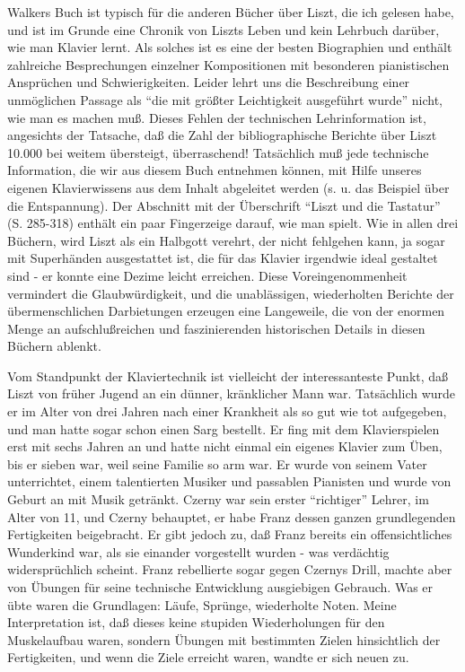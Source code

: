 Walkers Buch ist typisch für die anderen Bücher über Liszt, die ich gelesen habe, und ist im Grunde eine Chronik von Liszts Leben und kein Lehrbuch darüber, wie man Klavier lernt.
Als solches ist es eine der besten Biographien und enthält zahlreiche Besprechungen einzelner Kompositionen mit besonderen pianistischen Ansprüchen und Schwierigkeiten.
Leider lehrt uns die Beschreibung einer unmöglichen Passage als \enquote{die mit größter Leichtigkeit ausgeführt wurde} nicht, wie man es machen muß.
Dieses Fehlen der technischen Lehrinformation ist, angesichts der Tatsache, daß die Zahl der bibliographische Berichte über Liszt 10.000 bei weitem übersteigt, überraschend!
Tatsächlich muß jede technische Information, die wir aus diesem Buch entnehmen können, mit Hilfe unseres eigenen Klavierwissens aus dem Inhalt abgeleitet werden (s. u. das Beispiel über die Entspannung).
Der Abschnitt mit der Überschrift \enquote{Liszt und die Tastatur} (S. 285-318) enthält ein paar Fingerzeige darauf, wie man spielt.
Wie in allen drei Büchern, wird Liszt als ein Halbgott verehrt, der nicht fehlgehen kann, ja sogar mit Superhänden ausgestattet ist, die für das Klavier irgendwie ideal gestaltet sind - er konnte eine Dezime leicht erreichen.
Diese Voreingenommenheit vermindert die Glaubwürdigkeit, und die unablässigen, wiederholten Berichte der übermenschlichen Darbietungen erzeugen eine Langeweile, die von der enormen Menge an aufschlußreichen und faszinierenden historischen Details in diesen Büchern ablenkt.

Vom Standpunkt der Klaviertechnik ist vielleicht der interessanteste Punkt, daß Liszt von früher Jugend an ein dünner, kränklicher Mann war.
Tatsächlich wurde er im Alter von drei Jahren nach einer Krankheit als so gut wie tot aufgegeben, und man hatte sogar schon einen Sarg bestellt.
Er fing mit dem Klavierspielen erst mit sechs Jahren an und hatte nicht einmal ein eigenes Klavier zum Üben, bis er sieben war, weil seine Familie so arm war.
Er wurde von seinem Vater unterrichtet, einem talentierten Musiker und passablen Pianisten und wurde von Geburt an mit Musik getränkt.
Czerny war sein erster \enquote{richtiger} Lehrer, im Alter von 11, und Czerny behauptet, er habe Franz dessen ganzen grundlegenden Fertigkeiten beigebracht.
Er gibt jedoch zu, daß Franz bereits ein offensichtliches Wunderkind war, als sie einander vorgestellt wurden - was verdächtig widersprüchlich scheint.
Franz rebellierte sogar gegen Czernys Drill, machte aber von Übungen für seine technische Entwicklung ausgiebigen Gebrauch.
Was er übte waren die Grundlagen: Läufe, Sprünge, wiederholte Noten.
Meine Interpretation ist, daß dieses keine stupiden Wiederholungen für den Muskelaufbau waren, sondern Übungen mit bestimmten Zielen hinsichtlich der Fertigkeiten, und wenn die Ziele erreicht waren, wandte er sich neuen zu.

